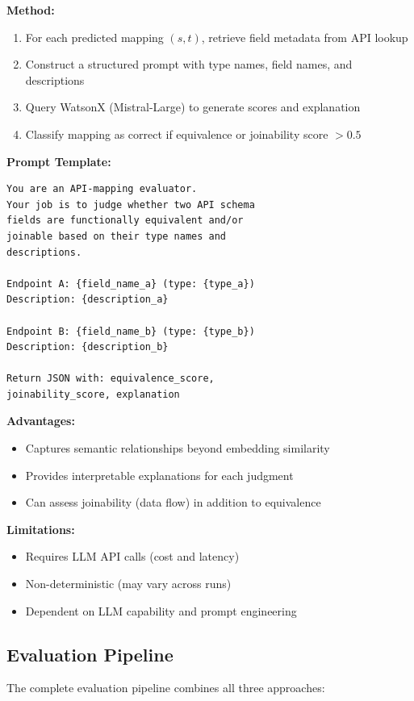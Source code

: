 \documentclass[sigconf, nonacm]{acmart}
\begin{document}
\textbf{Method:}
\begin{enumerate}
    \item For each predicted mapping $(s, t)$, retrieve field metadata from API lookup
    \item Construct a structured prompt with type names, field names, and descriptions
    \item Query WatsonX (Mistral-Large) to generate scores and explanation
    \item Classify mapping as correct if equivalence or joinability score $> 0.5$
\end{enumerate}

\textbf{Prompt Template:}
\begin{verbatim}
You are an API-mapping evaluator.
Your job is to judge whether two API schema
fields are functionally equivalent and/or
joinable based on their type names and
descriptions.

Endpoint A: {field_name_a} (type: {type_a})
Description: {description_a}

Endpoint B: {field_name_b} (type: {type_b})
Description: {description_b}

Return JSON with: equivalence_score,
joinability_score, explanation
\end{verbatim}

\textbf{Advantages:}
\begin{itemize}
    \item Captures semantic relationships beyond embedding similarity
    \item Provides interpretable explanations for each judgment
    \item Can assess joinability (data flow) in addition to equivalence
\end{itemize}

\textbf{Limitations:}
\begin{itemize}
    \item Requires LLM API calls (cost and latency)
    \item Non-deterministic (may vary across runs)
    \item Dependent on LLM capability and prompt engineering
\end{itemize}

\subsection{Evaluation Pipeline}

The complete evaluation pipeline combines all three approaches:
\end{document}
